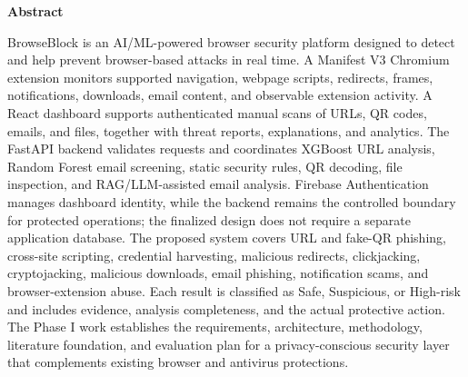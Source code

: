 \newpage
\thispagestyle{empty}
\begin{center}
  \vspace*{1cm}
  \textbf{\large Abstract}
\end{center}
BrowseBlock is an AI/ML-powered browser security platform designed to detect and help prevent browser-based attacks in real time. A Manifest V3 Chromium extension monitors supported navigation, webpage scripts, redirects, frames, notifications, downloads, email content, and observable extension activity. A React dashboard supports authenticated manual scans of URLs, QR codes, emails, and files, together with threat reports, explanations, and analytics. The FastAPI backend validates requests and coordinates XGBoost URL analysis, Random Forest email screening, static security rules, QR decoding, file inspection, and RAG/LLM-assisted email analysis. Firebase Authentication manages dashboard identity, while the backend remains the controlled boundary for protected operations; the finalized design does not require a separate application database. The proposed system covers URL and fake-QR phishing, cross-site scripting, credential harvesting, malicious redirects, clickjacking, cryptojacking, malicious downloads, email phishing, notification scams, and browser-extension abuse. Each result is classified as Safe, Suspicious, or High-risk and includes evidence, analysis completeness, and the actual protective action. The Phase I work establishes the requirements, architecture, methodology, literature foundation, and evaluation plan for a privacy-conscious security layer that complements existing browser and antivirus protections.


\thispagestyle{empty} %

\tableofcontents
\listoffigures
{}
\clearpage

\thispagestyle{empty} %

